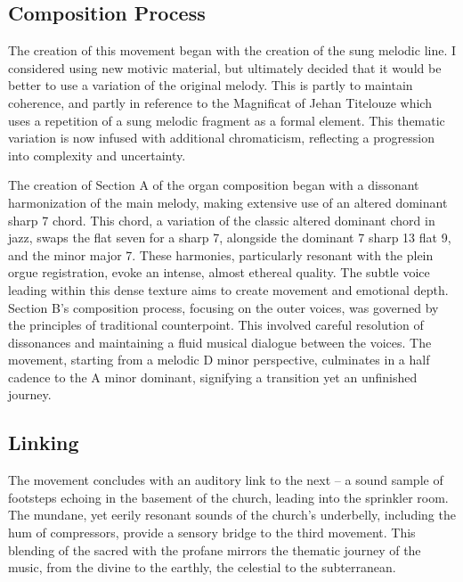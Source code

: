 \documentclass[12pt,twoside,maitrise]{dms_ks}
\theoremstyle{definition}
\begin{document}
\subsection{Composition Process}

The creation of this movement began with the creation of the sung melodic line.
I considered using new motivic material, but ultimately decided that it would be better to use a variation of the original melody.
This is partly to maintain coherence, and partly in reference to the Magnificat of Jehan Titelouze which uses a repetition of a sung melodic fragment as a formal element.
This thematic variation is now infused with additional chromaticism, reflecting a progression into complexity and uncertainty.


The creation of Section A of the organ composition began with a dissonant harmonization of the main melody, making extensive use of an altered dominant sharp 7 chord.
This chord, a variation of the classic altered dominant chord in jazz, swaps the flat seven for a sharp 7, alongside the dominant 7 sharp 13 flat 9, and the minor major 7.
These harmonies, particularly resonant with the plein orgue registration, evoke an intense, almost ethereal quality.
The subtle voice leading within this dense texture aims to create movement and emotional depth.
Section B's composition process, focusing on the outer voices, was governed by the principles of traditional counterpoint.
This involved careful resolution of dissonances and maintaining a fluid musical dialogue between the voices.
The movement, starting from a melodic D minor perspective, culminates in a half cadence to the A minor dominant, signifying a transition yet an unfinished journey.


\subsection{Linking}

The movement concludes with an auditory link to the next – a sound sample of footsteps echoing in the basement of the church, leading into the sprinkler room.
The mundane, yet eerily resonant sounds of the church's underbelly, including the hum of compressors, provide a sensory bridge to the third movement.
This blending of the sacred with the profane mirrors the thematic journey of the music, from the divine to the earthly, the celestial to the subterranean.
\end{document}
